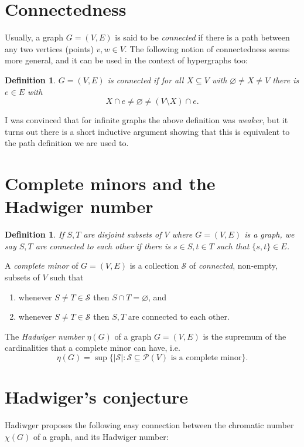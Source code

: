 \documentclass[12pt, a4paper]{amsart}
\newtheorem{definition}[lemma]{\bf Definition}
\begin{document}
\section{Connectedness}
Usually, a graph $G=(V,E)$ is said to be {\em connected} if there is
a path between any two vertices (points) $v, w\in V$. The following
notion of connectedness seems more general, and it can be
used in the context of hypergraphs too:
\begin{definition}
$G = (V,E)$ is {\em connected} if for all $X\subseteq V$ with 
$\varnothing \neq X \neq V$ there is $e\in E$ with 
	$$X \cap e \neq \varnothing \neq (V\setminus X)\cap e.$$
\end{definition}
I was convinced that for infinite graphs the above definition
was {\em weaker}, but it turns out there is a short inductive
argument showing that this is equivalent to the path definition
we are used to.
\section{Complete minors and the Hadwiger number}
\begin{definition}
If $S, T$ are disjoint subsets of $V$ where $G=(V,E)$ is a graph,
	we say $S,T$ are {\em connected to each other} if there
	is $s\in S, t\in T$ such that $\{s,t\} \in E$.
\end{definition}
A {\em complete minor} of $G=(V,E)$ is a collection ${\mathcal S}$ 
of {\em connected}, non-empty, subsets of $V$ such that
\begin{enumerate}
	\item whenever $S\neq T\in {\mathcal S}$ then $S\cap T = \varnothing$, and
	\item whenever $S\neq T\in {\mathcal S}$ then $S, T$ are connected
		to each other.
\end{enumerate}
The {\em Hadwiger number} $\eta(G)$ of a graph $G=(V,E)$ is the supremum
of the cardinalities that a complete minor can have, i.e.
$$\eta(G) = \sup\{|{\mathcal S}|: {\mathcal S}\subseteq {\mathcal P}(V) \text{ is
a complete minor}\}.$$

\section{Hadwiger's conjecture}
Hadiwger proposes the following easy connection between the
chromatic number $\chi(G)$ of a graph, and its Hadwiger number:

\vspace*{2mm}
\end{document}

